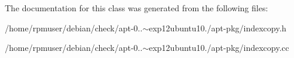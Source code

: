 \-The documentation for this class was generated from the following files\-:\begin{DoxyCompactItemize}
\item 
/home/rpmuser/debian/check/apt-\/0..$\sim$exp12ubuntu10./apt-\/pkg/indexcopy.\-h\item 
/home/rpmuser/debian/check/apt-\/0..$\sim$exp12ubuntu10./apt-\/pkg/indexcopy.\-cc\end{DoxyCompactItemize}
